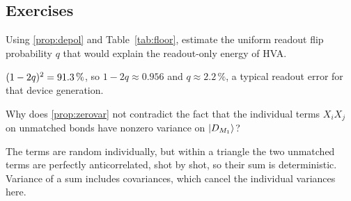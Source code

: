 \subsection*{Exercises}

\begin{exer}
  Using \cref{prop:depol} and Table~\ref{tab:floor}, estimate the uniform readout flip
  probability $q$ that would explain the readout-only energy of HVA.
\end{exer}
\begin{sol}
  $(1-2q)^2=91.3\,\%$, so $1-2q\approx0.956$ and $q\approx2.2\,\%$, a typical readout
  error for that device generation.
\end{sol}

\begin{exer}
  Why does \cref{prop:zerovar} not contradict the fact that the individual terms $X_iX_j$ on
  unmatched bonds have nonzero variance on $\ket{D_{M_1}}$?
\end{exer}
\begin{sol}
  The terms are random individually, but within a triangle the two unmatched terms are
  perfectly anticorrelated, shot by shot, so their sum is deterministic. Variance of a sum
  includes covariances, which cancel the individual variances here.
\end{sol}
